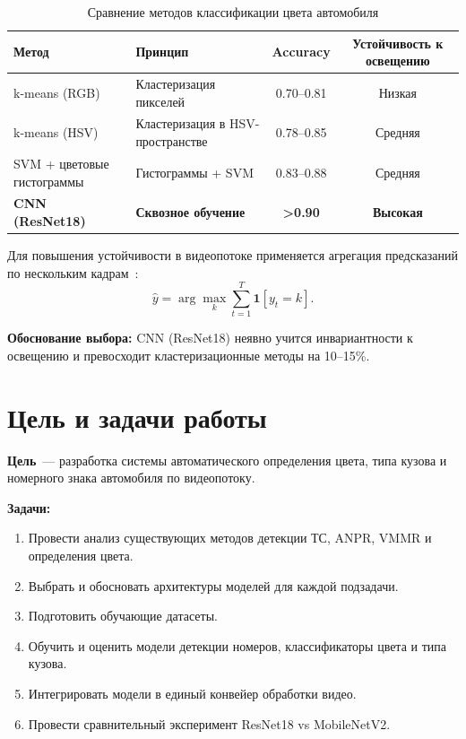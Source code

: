 \documentclass[14pt,a4paper]{report}
\numberwithin{equation}{chapter}
\numberwithin{figure}{chapter}
\numberwithin{table}{chapter}
\begin{document}
\begin{table}[H]
\centering
\caption{Сравнение методов классификации цвета автомобиля}
\label{tab:color_methods}
\begin{tabularx}{\textwidth}{lXcc}
\toprule
\textbf{Метод} & \textbf{Принцип} & \textbf{Accuracy} & \textbf{Устойчивость к освещению} \\
\midrule
k-means (RGB)       & Кластеризация пикселей         & 0.70--0.81 & Низкая \\
k-means (HSV)       & Кластеризация в HSV-пространстве & 0.78--0.85 & Средняя \\
SVM + цветовые гистограммы & Гистограммы + SVM        & 0.83--0.88 & Средняя \\
\textbf{CNN (ResNet18)} & \textbf{Сквозное обучение}  & \textbf{>0.90} & \textbf{Высокая} \\
\bottomrule
\end{tabularx}
\end{table}

Для повышения устойчивости в видеопотоке применяется агрегация предсказаний
по нескольким кадрам~\cite{kubatin2019}:
\begin{equation}
  \hat{y} = \arg\max_{k}\sum_{t=1}^{T} \mathbf{1}[y_t = k].
\end{equation}

\noindent\textbf{Обоснование выбора:} CNN (ResNet18) неявно учится
инвариантности к освещению и превосходит кластеризационные методы на 10--15\%.

\section{Цель и задачи работы}

\textbf{Цель}~--- разработка системы автоматического определения цвета,
типа кузова и номерного знака автомобиля по видеопотоку.

\textbf{Задачи:}
\begin{enumerate}
  \item Провести анализ существующих методов детекции ТС, ANPR, VMMR и определения цвета.
  \item Выбрать и обосновать архитектуры моделей для каждой подзадачи.
  \item Подготовить обучающие датасеты.
  \item Обучить и оценить модели детекции номеров, классификаторы цвета и типа кузова.
  \item Интегрировать модели в единый конвейер обработки видео.
  \item Провести сравнительный эксперимент ResNet18 vs MobileNetV2.
\end{enumerate}
\end{document}
